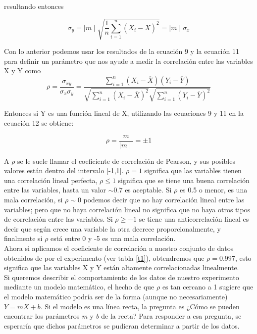 \documentclass[12pt,letterpaper]{report}
\begin{document}
resultando entonces

\begin{equation}
\sigma_{y}=\mid m\mid \sqrt{\frac{1}{n}\sum_{i=1}^{n}(X_{i} - \overline{X})^{2}} = \mid m \mid \sigma_{x}
\end{equation}

Con lo anterior podemos usar los resultados de la ecuación 9 y la ecuación 11 para definir un parámetro que nos ayude a medir la correlación entre las variables X y Y como
\begin{equation}
\rho =\dfrac{\sigma_{xy}}{\sigma_{x}\sigma_{y}}= \dfrac{\displaystyle\sum_{i=1}^{n} (X_{i}- \overline{X})(Y_{i}  - \overline{Y})}{\sqrt{\displaystyle\sum_{i=1}^{n}(X_{i}- \overline{X})^{2}}  \sqrt{\displaystyle\sum_{i=1}^{n}(Y_{i}- \overline{Y})^{2}} }
\end{equation}

Entonces si Y es una función lineal de X, utilizando las ecuaciones 9 y 11 en la ecuación  12 se obtiene:  

\begin{equation}
\rho =\dfrac{m}{\mid m\mid}= \pm 1
\end{equation}

A $\rho$ se le suele llamar el coeficiente de correlación de Pearson, y sus posibles valores están dentro del intervalo [-1,1]. $ \rho = 1$ significa que las variables tienen una correlación lineal perfecta, $ \rho \leqslant 1 $ significa que se tiene una buena correlación entre las variables, hasta un valor $ \sim 0.7 $ es aceptable. Si $ \rho $  es 0.5 o menor, es una mala correlación, si $ \rho \sim 0$ podemos decir que no hay correlación lineal entre las variables; pero que no haya correlación lineal no significa que no haya otros tipos de correlación entre las variables. Si $ \rho \geq -1 $ se tiene una anticorrelación lineal es decir que según crece una variable la otra decrece proporcionalmente, y finalmente si $ \rho $ está entre 0 y -5 es una mala correlación.\\

Ahora si aplicamos el coeficiente de correlación a nuestro conjunto de datos obtenidos de  por el experimento (ver tabla \ref{t1}), obtendremos que $\rho = 0.997$, esto significa que las variables X y Y están altamente correlacionadas linealmente. \\

Si queremos describir el comportamiento de los datos de nuestro experimento mediante un modelo matemático, el hecho de que $ \rho $ es tan cercano a 1 sugiere que el modelo matemático podría  ser de la forma (aunque no necesariamente) $ Y= mX+b$. Si el modelo es  una línea recta, la pregunta es ¿Cómo se pueden encontrar los parámetros \textit{m} y \textit{b} de la recta? Para responder a esa pregunta, se esperaría que dichos parámetros se pudieran determinar a partir de los datos.\\
\end{document}
